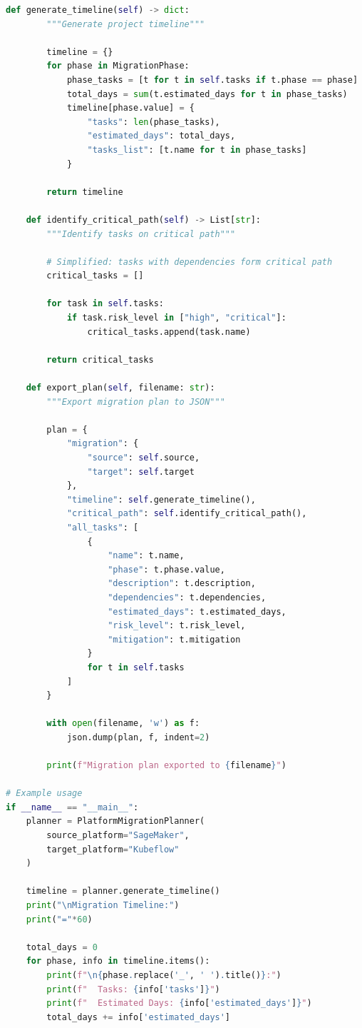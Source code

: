 \begin{lstlisting}[language=Python, caption=Platform Migration Plan Template]
    def generate_timeline(self) -> dict:
        """Generate project timeline"""

        timeline = {}
        for phase in MigrationPhase:
            phase_tasks = [t for t in self.tasks if t.phase == phase]
            total_days = sum(t.estimated_days for t in phase_tasks)
            timeline[phase.value] = {
                "tasks": len(phase_tasks),
                "estimated_days": total_days,
                "tasks_list": [t.name for t in phase_tasks]
            }

        return timeline

    def identify_critical_path(self) -> List[str]:
        """Identify tasks on critical path"""

        # Simplified: tasks with dependencies form critical path
        critical_tasks = []

        for task in self.tasks:
            if task.risk_level in ["high", "critical"]:
                critical_tasks.append(task.name)

        return critical_tasks

    def export_plan(self, filename: str):
        """Export migration plan to JSON"""

        plan = {
            "migration": {
                "source": self.source,
                "target": self.target
            },
            "timeline": self.generate_timeline(),
            "critical_path": self.identify_critical_path(),
            "all_tasks": [
                {
                    "name": t.name,
                    "phase": t.phase.value,
                    "description": t.description,
                    "dependencies": t.dependencies,
                    "estimated_days": t.estimated_days,
                    "risk_level": t.risk_level,
                    "mitigation": t.mitigation
                }
                for t in self.tasks
            ]
        }

        with open(filename, 'w') as f:
            json.dump(plan, f, indent=2)

        print(f"Migration plan exported to {filename}")

# Example usage
if __name__ == "__main__":
    planner = PlatformMigrationPlanner(
        source_platform="SageMaker",
        target_platform="Kubeflow"
    )

    timeline = planner.generate_timeline()
    print("\nMigration Timeline:")
    print("="*60)

    total_days = 0
    for phase, info in timeline.items():
        print(f"\n{phase.replace('_', ' ').title()}:")
        print(f"  Tasks: {info['tasks']}")
        print(f"  Estimated Days: {info['estimated_days']}")
        total_days += info['estimated_days']


\end{lstlisting}
